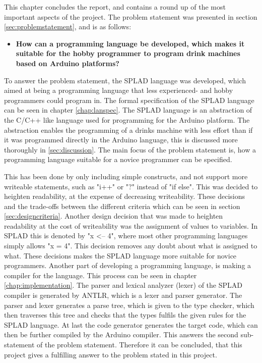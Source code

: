 \label{chap:konklusion}
This chapter concludes the report, and contains a round up of the most important aspects of the project.
The problem statement was presented in section \ref{sec:problemstatement}, and is as follows: 
\begin{itemize}
	\item \textbf{How can a programming language be developed, which makes it suitable for the hobby programmer to program drink machines based on Arduino platforms?}
\end{itemize}

To answer the problem statement, the SPLAD language was developed, which aimed at being a programming language that less experienced- and hobby programmers could program in. The formal specification of the SPLAD language can be seen in chapter \ref{chap:lanspec}. The SPLAD language is an abstraction of the C/C++ like language used for programming for the Arduino platform. The abstraction enables the programming of a drinks machine with less effort than if it was programmed directly in the Arduino language, this is discussed more thoroughly in \ref{sec:discussion}. The main focus of the problem statement is, how a programming language suitable for a novice programmer can be specified.

This has been done by only including simple constructs, and not support more writeable statements, such as "i++" or "?" instead of "if else". This was decided to heighten readability, at the expense of decreasing writeability. These decisions and the trade-offs between the different criteria which can be seen in section \ref{sec:designcriteria}. Another design decision that was made to heighten readability at the cost of writeability was the assignment of values to variables. In SPLAD this is denoted by "x <-- 4", where most other programming languages simply allows "x = 4". This decision removes any doubt about what is assigned to what. These decisions makes the SPLAD language more suitable for novice programmers.
Another part of developing a programming language, is making a compiler for the language. This process can be seen in chapter \ref{chap:implementation}. The parser and lexical analyzer (lexer) of the SPLAD compiler is generated by ANTLR, which is a lexer and parser generator. The parser and lexer generates a parse tree, which is given to the type checker, which then traverses this tree and checks that the types fulfils the given rules for the SPLAD language. At last the code generator generates the target code, which can then be further compiled by the Arduino compiler. This answers the second sub-statement of the problem statement. Therefore it can be concluded, that this project gives a fulfilling answer to the problem stated in this project. 
